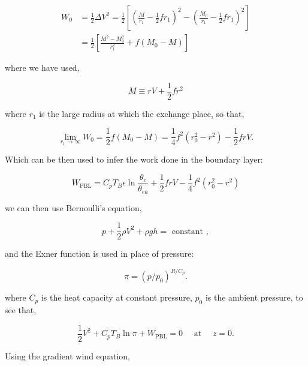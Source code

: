 \begin{equation}
\begin{aligned}
W_{0} &=\frac{1}{2} \Delta V^{2}=\frac{1}{2}\left[\left(\frac{M}{r_{1}}
-\frac{1}{2} f r_{1}\right)^{2}-\left(\frac{M_{0}}{r_{1}}-\frac{1}{2} f r_{1}\right)^{2}\right] \\
&=\frac{1}{2}\left[\frac{M^{2}-M_{0}^{2}}{r_{1}^{2}}+f\left(M_{0}-M\right)\right]
\end{aligned}
\end{equation}

where we have used,

\begin{equation}
M \equiv r V+\frac{1}{2} f r^{2}
\end{equation}

where $r_1$ is the large radius at which the exchange place, so that,

\begin{equation}
\lim _{r_{1} \rightarrow \infty} W_{0}=\frac{1}{2} f\left(M_{0}-M\right)=\frac{1}{4} f^{2}\left(r_{0}^{2}-r^{2}\right)-\frac{1}{2} f r V.
\end{equation}

Which can be then used to infer the work done in the boundary layer:

\begin{equation}
W_{\mathrm{PBL}}=C_{p} T_{B} \epsilon \ln \frac{\theta_{e}}{\theta_{e a}}+\frac{1}{2} f r V-\frac{1}{4} f^{2}\left(r_{0}^{2}-r^{2}\right)
\end{equation}


we can then use Bernoulli's equation,

\begin{equation}
p+\frac{1}{2} \rho V^{2}+\rho g h=\text { constant },
\end{equation}

and the Exner function is used in place of pressure:

\begin{equation}
\pi=\left(p / p_{0}\right)^{R / C_{p}}.
\end{equation}

where $C_p$ is the heat capacity at constant pressure,
$p_{0}$ is the ambient pressure, to see that,

\begin{equation}
\frac{1}{2}
V^{2}+C_{p} T_{B} \ln \pi+W_{\mathrm{PBL}}=0 \quad \text { at } \quad z=0.
\end{equation}


Using the gradient wind equation,

